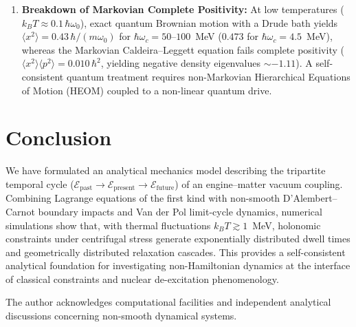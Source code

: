 \documentclass[aps,prc,twocolumn,superscriptaddress,amsmath,amssymb,nofootinbib]{revtex4-2}
\begin{document}
\begin{enumerate}
    \item \textbf{Breakdown of Markovian Complete Positivity:} At low temperatures (\(k_B T \approx 0.1\,\hbar\omega_0\)), exact quantum Brownian motion with a Drude bath yields \(\langle x^2 \rangle = 0.43\,\hbar/(m\omega_0)\) for \(\hbar\omega_c = 50\text{--}100\)~MeV (\(0.473\) for \(\hbar\omega_c = 4.5\)~MeV), whereas the Markovian Caldeira--Leggett equation fails complete positivity (\(\langle x^2 \rangle \langle p^2 \rangle = 0.010\,\hbar^2\), yielding negative density eigenvalues \(\sim -1.11\)). A self-consistent quantum treatment requires non-Markovian Hierarchical Equations of Motion (HEOM) coupled to a non-linear quantum drive.
\end{enumerate}

\section{Conclusion}
We have formulated an analytical mechanics model describing the tripartite temporal cycle (\(\mathcal{E}_{\text{past}} \to \mathcal{E}_{\text{present}} \to \mathcal{E}_{\text{future}}\)) of an engine--matter vacuum coupling. Combining Lagrange equations of the first kind with non-smooth D'Alembert--Carnot boundary impacts and Van der Pol limit-cycle dynamics, numerical simulations show that, with thermal fluctuations \(k_BT \gtrsim 1\)~MeV, holonomic constraints under centrifugal stress generate exponentially distributed dwell times and geometrically distributed relaxation cascades. This provides a self-consistent analytical foundation for investigating non-Hamiltonian dynamics at the interface of classical constraints and nuclear de-excitation phenomenology.

\begin{acknowledgments}
The author acknowledges computational facilities and independent analytical discussions concerning non-smooth dynamical systems.
\end{acknowledgments}
\end{document}
